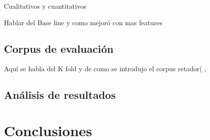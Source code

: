 \documentclass[letterpaper,12pt,oneside]{book}
\begin{document}
Cualitativos y cuantitativos

Hablar del Base line y como mejoró con mas features

\section{Corpus de evaluación}

Aquí se habla del K fold y de como se introdujo el corpus retador( ,

\citet{singh2005comparison}

\section{Análisis de resultados}

\chapter{Conclusiones}


	
\end{document}
